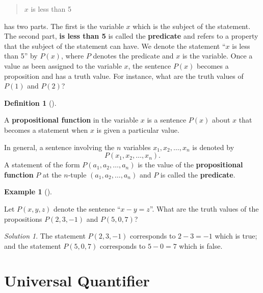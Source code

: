\documentclass[
  letterpaper,
  10pt,
  reqno,
  twopage,
  openany]{book}
\theoremstyle{plain}
\theoremstyle{definition}
\theoremstyle{definition}
\newtheorem{definition}{Definition}[chapter]
\theoremstyle{definition}
\newtheorem{example}{Example}[chapter]
\theoremstyle{plain}
\theoremstyle{plain}
\theoremstyle{remark}
\newtheorem*{solution}{Solution}
\begin{document}
\begin{quote}
\(x\) is less than 5
\end{quote}

has two parts. The first is the variable \(x\) which is the subject of
the statement. The second part, \textbf{is less than 5} is called the
 \textbf{predicate} and refers to a property that the
subject of the statement can have. We denote the statement ``\(x\) is
less than 5'' by \(P(x)\), where \(P\) denotes the predicate and \(x\)
is the variable. Once a value as been assigned to the variable \(x\),
the sentence \(P(x)\) becomes a proposition and has a truth value. For
instance, what are the truth values of \(P(1)\) and \(P(2)\)?

\leavevmode{}%
\begin{definition}[]\label{def-propositional-function}

A  \textbf{propositional function} in the
variable \(x\) is a sentence \(P(x)\) about \(x\) that becomes a
statement when \(x\) is given a particular value.

\end{definition}

In general, a sentence involving the \(n\) variables
\(x_1, x_2, \ldots, x_n\) is denoted by \[
P(x_1, x_2, \dots, x_n).
\] A statement of the form \(P(a_1, a_2, \ldots, a_n)\) is the value of
the  \textbf{propositional function} \(P\)
at the \(n\)-tuple \((a_1, a_2, \ldots, a_n)\) and \(P\) is called the
 \textbf{predicate}.

\leavevmode{}%
\begin{example}[]\label{exm-tvprop}

Let \(P(x,y,z)\) denote the sentence ``\(x-y=z\)''. What are the truth
values of the propositions \(P(2,3,-1)\) and \(P(5,0,7)\)?

\end{example}

\begin{solution}

The statement \(P(2,3,-1)\) corresponds to \(2-3=-1\) which is true; and
the statement \(P(5,0,7)\) corresponds to \(5-0=7\) which is false.

\end{solution}

\hypertarget{universal-quantifier}{%
\section{Universal Quantifier}\label{universal-quantifier}}
\end{document}
